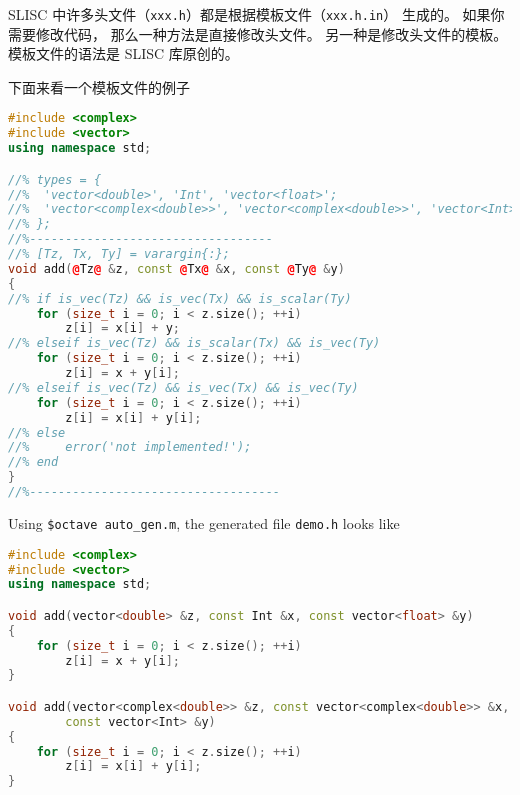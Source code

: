 
\begin{issues}
\issueDraft
\end{issues}


SLISC 中许多头文件（\verb|xxx.h|）都是根据模板文件（\verb|xxx.h.in|） 生成的。 如果你需要修改代码， 那么一种方法是直接修改头文件。 另一种是修改头文件的模板。 模板文件的语法是 SLISC 库原创的。

下面来看一个模板文件的例子
\begin{lstlisting}[language=cpp, caption=demo.h.in]
#include <complex>
#include <vector>
using namespace std;

//% types = {
//%  'vector<double>', 'Int', 'vector<float>';
//%  'vector<complex<double>>', 'vector<complex<double>>', 'vector<Int>';
//% };
//%----------------------------------
//% [Tz, Tx, Ty] = varargin{:};
void add(@Tz@ &z, const @Tx@ &x, const @Ty@ &y)
{
//% if is_vec(Tz) && is_vec(Tx) && is_scalar(Ty)
	for (size_t i = 0; i < z.size(); ++i)
		z[i] = x[i] + y;
//% elseif is_vec(Tz) && is_scalar(Tx) && is_vec(Ty)
	for (size_t i = 0; i < z.size(); ++i)
		z[i] = x + y[i];
//% elseif is_vec(Tz) && is_vec(Tx) && is_vec(Ty)
	for (size_t i = 0; i < z.size(); ++i)
		z[i] = x[i] + y[i];
//% else
//%     error('not implemented!');
//% end
}
//%-----------------------------------
\end{lstlisting}

Using \verb`$octave auto_gen.m`, the generated file \verb`demo.h` looks like
\begin{lstlisting}[language=cpp]
#include <complex>
#include <vector>
using namespace std;

void add(vector<double> &z, const Int &x, const vector<float> &y)
{
	for (size_t i = 0; i < z.size(); ++i)
		z[i] = x + y[i];
}

void add(vector<complex<double>> &z, const vector<complex<double>> &x,
        const vector<Int> &y)
{
	for (size_t i = 0; i < z.size(); ++i)
		z[i] = x[i] + y[i];
}
\end{lstlisting}

